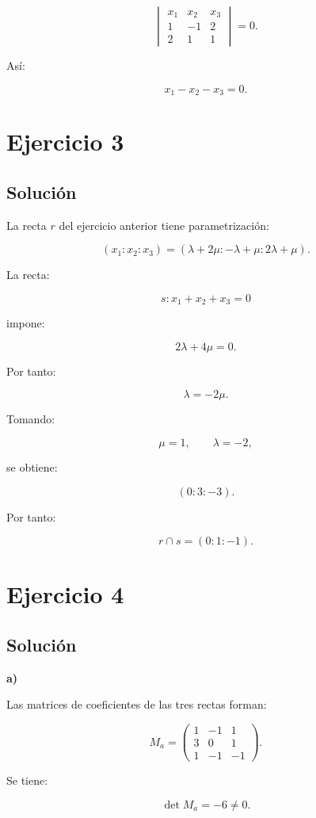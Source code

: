 \documentclass[11pt,a4paper]{article}
\begin{document}
\[
\begin{vmatrix}
x_1&x_2&x_3\\
1&-1&2\\
2&1&1
\end{vmatrix}
=0.
\]

Así:

\[
\boxed{
x_1-x_2-x_3=0.
}
\]

\section{Ejercicio 3}
\subsection{Solución}

La recta \(r\) del ejercicio anterior tiene parametrización:

\[
(x_1:x_2:x_3)
=
(\lambda+2\mu:-\lambda+\mu:2\lambda+\mu).
\]

La recta:

\[
s:
x_1+x_2+x_3=0
\]

impone:

\[
2\lambda+4\mu=0.
\]

Por tanto:

\[
\lambda=-2\mu.
\]

Tomando:

\[
\mu=1,
\qquad
\lambda=-2,
\]

se obtiene:

\[
(0:3:-3).
\]

Por tanto:

\[
\boxed{
r\cap s=(0:1:-1).
}
\]

\section{Ejercicio 4}
\subsection{Solución}

\textbf{a)}

Las matrices de coeficientes de las tres rectas forman:

\[
M_a=
\begin{pmatrix}
1&-1&1\\
3&0&1\\
1&-1&-1
\end{pmatrix}.
\]

Se tiene:

\[
\det M_a=-6\neq0.
\]
\end{document}
